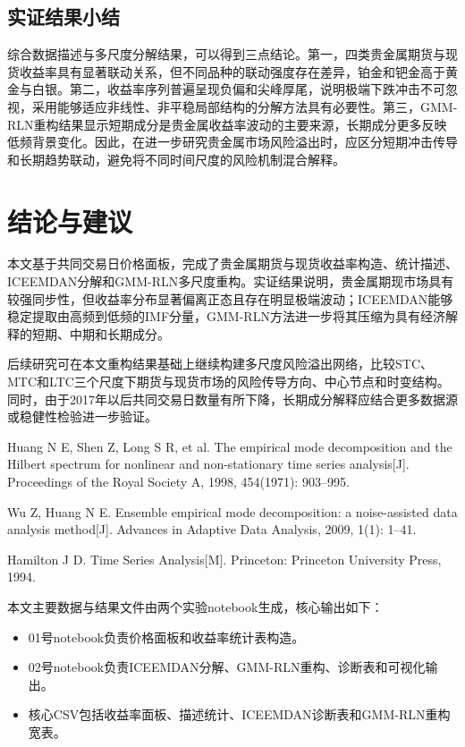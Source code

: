 \subsection{实证结果小结}
综合数据描述与多尺度分解结果，可以得到三点结论。第一，四类贵金属期货与现货收益率具有显著联动关系，但不同品种的联动强度存在差异，铂金和钯金高于黄金与白银。第二，收益率序列普遍呈现负偏和尖峰厚尾，说明极端下跌冲击不可忽视，采用能够适应非线性、非平稳局部结构的分解方法具有必要性。第三，GMM-RLN重构结果显示短期成分是贵金属收益率波动的主要来源，长期成分更多反映低频背景变化。因此，在进一步研究贵金属市场风险溢出时，应区分短期冲击传导和长期趋势联动，避免将不同时间尺度的风险机制混合解释。

\section{结论与建议}
本文基于共同交易日价格面板，完成了贵金属期货与现货收益率构造、统计描述、ICEEMDAN分解和GMM-RLN多尺度重构。实证结果说明，贵金属期现市场具有较强同步性，但收益率分布显著偏离正态且存在明显极端波动；ICEEMDAN能够稳定提取由高频到低频的IMF分量，GMM-RLN方法进一步将其压缩为具有经济解释的短期、中期和长期成分。

后续研究可在本文重构结果基础上继续构建多尺度风险溢出网络，比较STC、MTC和LTC三个尺度下期货与现货市场的风险传导方向、中心节点和时变结构。同时，由于2017年以后共同交易日数量有所下降，长期成分解释应结合更多数据源或稳健性检验进一步验证。

\begin{cnreferences}
  \item Huang N E, Shen Z, Long S R, et al. The empirical mode decomposition and the Hilbert spectrum for nonlinear and non-stationary time series analysis[J]. Proceedings of the Royal Society A, 1998, 454(1971): 903--995.
  \item Wu Z, Huang N E. Ensemble empirical mode decomposition: a noise-assisted data analysis method[J]. Advances in Adaptive Data Analysis, 2009, 1(1): 1--41.
  \item Hamilton J D. Time Series Analysis[M]. Princeton: Princeton University Press, 1994.
\end{cnreferences}

\appendixheading
本文主要数据与结果文件由两个实验notebook生成，核心输出如下：
\begin{itemize}[leftmargin=2em,itemsep=0pt,topsep=0pt]
  \item 01号notebook负责价格面板和收益率统计表构造。
  \item 02号notebook负责ICEEMDAN分解、GMM-RLN重构、诊断表和可视化输出。
  \item 核心CSV包括收益率面板、描述统计、ICEEMDAN诊断表和GMM-RLN重构宽表。
\end{itemize}

